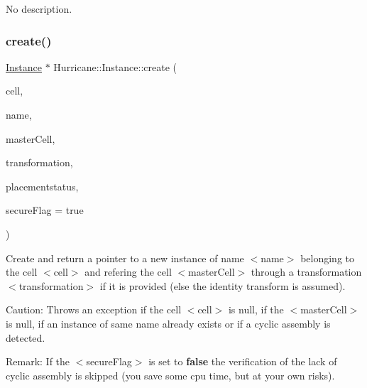 No description. \mbox{\label{classHurricane_1_1Instance_ad5784305151e45c9d949a74bd85aaa36}} 
\subsubsection{\texorpdfstring{create()}{create()}\hspace{0.1cm}{\footnotesize\ttfamily [2/2]}}
{\footnotesize\ttfamily \mbox{\hyperlink{classHurricane_1_1Instance}{Instance}} $\ast$ Hurricane\+::\+Instance\+::create (\begin{DoxyParamCaption}\item[{\mbox{\hyperlink{classHurricane_1_1Cell}{Cell}} $\ast$}]{cell,  }\item[{const \mbox{\hyperlink{classHurricane_1_1Name}{Name}} \&}]{name,  }\item[{\mbox{\hyperlink{classHurricane_1_1Cell}{Cell}} $\ast$}]{master\+Cell,  }\item[{const \mbox{\hyperlink{classHurricane_1_1Transformation}{Transformation}} \&}]{transformation,  }\item[{const \mbox{\hyperlink{classHurricane_1_1Instance_1_1PlacementStatus}{Placement\+Status}} \&}]{placementstatus,  }\item[{bool}]{secure\+Flag = {\ttfamily true} }\end{DoxyParamCaption})\hspace{0.3cm}{\ttfamily [static]}}

Create and return a pointer to a new instance of name {\ttfamily $<$name$>$} belonging to the cell {\ttfamily $<$cell$>$} and refering the cell {\ttfamily $<$master\+Cell$>$} through a transformation {\ttfamily $<$transformation$>$} if it is provided (else the identity transform is assumed).

\begin{DoxyParagraph}{Caution\+: Throws an exception if the cell {\ttfamily $<$cell$>$} is null, if the }
{\ttfamily $<$master\+Cell$>$} is null, if an instance of same name already exists or if a cyclic assembly is detected.
\end{DoxyParagraph}
\begin{DoxyParagraph}{Remark\+: If the {\ttfamily $<$secure\+Flag$>$} is set to {\bfseries false} the verification of }
the lack of cyclic assembly is skipped (you save some cpu time, but at your own risks). 
\end{DoxyParagraph}
\mbox{\label{classHurricane_1_1Instance_aa48280b4d7127d283c89983cf7a42c23}} 
